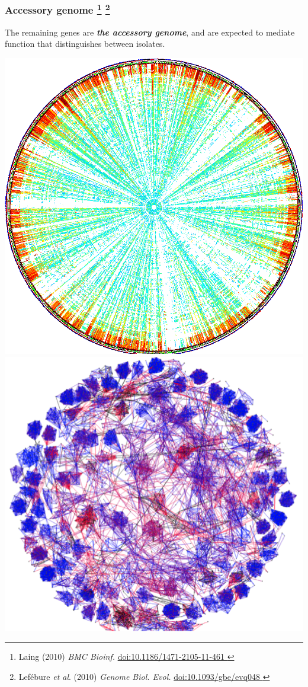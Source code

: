 \begin{frame}
  \frametitle{Accessory genome
    \footnote{\tiny{Laing (2010) \textit{BMC Bioinf.} \href{http://dx.doi.org/10.1186/1471-2105-11-461}{doi:10.1186/1471-2105-11-461
  }}}
    \footnote{\tiny{Lef\'{e}bure \textit{et al}. (2010) \textit{Genome Biol. Evol.} \href{http://dx.doi.org/10.1371/10.1093/gbe/evq048}{doi:10.1093/gbe/evq048
    }}}  
}
  \textcolor{hutton_green}{The remaining genes are \textbf{\textit{the accessory genome}}, and are expected to mediate function that distinguishes between isolates.}\\[0.2cm]
  \begin{center}
      \includegraphics[height=0.5\textheight]{images/pba_400_circular}        
      \includegraphics[height=0.5\textheight]{images/accessory_cluster}      
  \end{center}
\end{frame}

